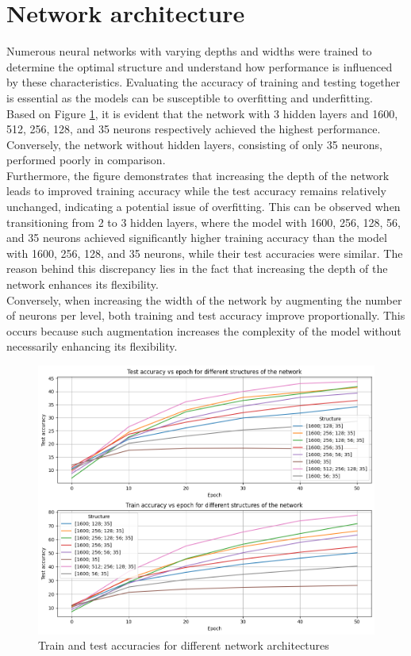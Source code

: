 \documentclass[eng]{class}
\begin{document}
\section{Network architecture}
Numerous neural networks with varying depths and widths were trained to determine the optimal structure
and understand how performance is influenced by these characteristics. Evaluating the accuracy of training and
testing together is essential as the models can be susceptible to overfitting and underfitting. \\
Based on Figure \ref{fig-3}, it is evident that the network with 3 hidden layers and 1600, 512, 256, 128, and 35 neurons
respectively achieved the highest performance. Conversely, the network without hidden layers, consisting of only 35 neurons,
performed poorly in comparison. \\
Furthermore, the figure demonstrates that increasing the depth of the network leads to improved training accuracy
while the test accuracy remains relatively unchanged, indicating a potential issue of overfitting.
This can be observed when transitioning from 2 to 3 hidden layers, where the model with 1600, 256, 128, 56, and 35 neurons
achieved significantly higher training accuracy than the model with 1600, 256, 128, and 35 neurons,
while their test accuracies were similar. The reason behind this discrepancy lies in the fact that increasing the depth of
the network enhances its flexibility. \\
Conversely, when increasing the width of the network by augmenting the number of neurons per level, both training and
test accuracy improve proportionally. This occurs because such augmentation increases the complexity of the model without
necessarily enhancing its flexibility.

\begin{figure}[h]
  \centering
  \includegraphics[width=.8\columnwidth]{images/diff_structures.png}
  \caption{Train and test accuracies for different network architectures}
  \label{fig-3}
\end{figure}
\end{document}
